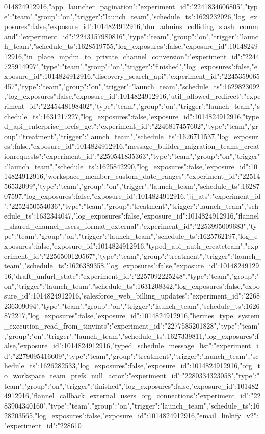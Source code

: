 {014824912916},"app_launcher_pagination":{"experiment_id":"2241834606805","type":"team","group":"on","trigger":"launch_team","schedule_ts":1629232026,"log_exposures":false,"exposure_id":1014824912916},"dm_admins_colliding_slash_command":{"experiment_id":"2243157980816","type":"team","group":"on","trigger":"launch_team","schedule_ts":1628519755,"log_exposures":false,"exposure_id":1014824912916},"in_place_mpdm_to_private_channel_conversion":{"experiment_id":"2244725914997","type":"team","group":"on","trigger":"finished","log_exposures":false,"exposure_id":1014824912916},"discovery_search_api":{"experiment_id":"2245359065457","type":"team","group":"on","trigger":"launch_team","schedule_ts":1629823092,"log_exposures":false,"exposure_id":1014824912916},"util_allowed_redirect":{"experiment_id":"2245448198402","type":"team","group":"on","trigger":"launch_team","schedule_ts":1631217227,"log_exposures":false,"exposure_id":1014824912916},"typed_api_enterprise_prefs_get":{"experiment_id":"2246817457602","type":"team","group":"treatment","trigger":"launch_team","schedule_ts":1626711537,"log_exposures":false,"exposure_id":1014824912916},"message_builder_migration_teams_creationrequests":{"experiment_id":"2250541835363","type":"team","group":"on","trigger":"launch_team","schedule_ts":1625842290,"log_exposures":false,"exposure_id":1014824912916},"workspace_member_custom_date_ranges":{"experiment_id":"2251456532099","type":"team","group":"on","trigger":"launch_team","schedule_ts":1628707597,"log_exposures":false,"exposure_id":1014824912916},"jj_ats":{"experiment_id":"2252450554036","type":"team","group":"treatment","trigger":"launch_team","schedule_ts":1632344047,"log_exposures":false,"exposure_id":1014824912916},"flannel_shared_channel_users_format_external":{"experiment_id":"2253995009683","type":"team","group":"on","trigger":"launch_team","schedule_ts":1625762197,"log_exposures":false,"exposure_id":1014824912916},"typed_api_auth_createteam":{"experiment_id":"2256500120567","type":"team","group":"treatment","trigger":"launch_team","schedule_ts":1626389358,"log_exposures":false,"exposure_id":1014824912916},"draft_unfurl_state":{"experiment_id":"2257092225248","type":"team","group":"on","trigger":"launch_team","schedule_ts":1631208342,"log_exposures":false,"exposure_id":1014824912916},"salesforce_web_billing_updates":{"experiment_id":"2268236309094","type":"team","group":"on","trigger":"launch_team","schedule_ts":1626872217,"log_exposures":false,"exposure_id":1014824912916},"hermes_type_system_execution_read_from_tinyints":{"experiment_id":"2277585201828","type":"team","group":"on","trigger":"launch_team","schedule_ts":1627339811,"log_exposures":false,"exposure_id":1014824912916},"typed_schedule_message_list":{"experiment_id":"2279095416609","type":"team","group":"treatment","trigger":"launch_team","schedule_ts":1626282533,"log_exposures":false,"exposure_id":1014824912916},"org_to_workspace_team_prefs_null_actor":{"experiment_id":"2280334323058","type":"team","group":"on","trigger":"finished","log_exposures":false,"exposure_id":1014824912916},"flannel_callback_external_users_org_connections":{"experiment_id":"2283904340160","type":"team","group":"on","trigger":"launch_team","schedule_ts":1628203565,"log_exposures":false,"exposure_id":1014824912916},"email_linkify_v2":{"experiment_id":"228610}
